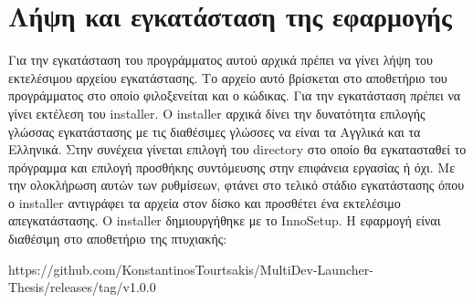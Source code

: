 







\section{Λήψη και εγκατάσταση της εφαρμογής}
Για την εγκατάσταση του προγράμματος αυτού αρχικά πρέπει να γίνει λήψη του εκτελέσιμου
αρχείου εγκατάστασης. Το αρχείο αυτό βρίσκεται στο αποθετήριο του προγράμματος στο οποίο
φιλοξενείται και ο κώδικας. Για την εγκατάσταση πρέπει να γίνει εκτέλεση του installer. Ο
installer αρχικά δίνει την δυνατότητα επιλογής γλώσσας εγκατάστασης με τις διαθέσιμες γλώσσες
να είναι τα Αγγλικά και τα Ελληνικά. Στην συνέχεια γίνεται επιλογή του directory στο οποίο θα
εγκατασταθεί το πρόγραμμα και επιλογή προσθήκης συντόμευσης στην επιφάνεια εργασίας ή όχι. Με
την ολοκλήρωση αυτών των ρυθμίσεων, φτάνει στο τελικό στάδιο εγκατάστασης όπου ο installer 
αντιγράφει τα αρχεία στον δίσκο και προσθέτει ένα εκτελέσιμο απεγκατάστασης. Ο installer
δημιουργήθηκε με το InnoSetup. Η εφαρμογή είναι διαθέσιμη στο αποθετήριο της πτυχιακής: 

https://github.com/KonstantinosTourtsakis/MultiDev-Launcher-Thesis/releases/tag/v1.0.0
